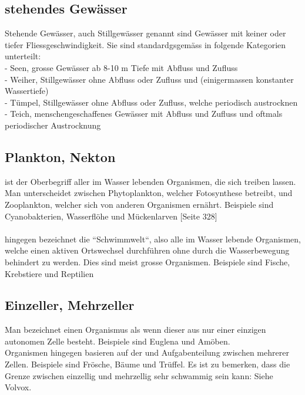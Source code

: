 \documentclass{article}
\begin{document}
    \subsection{stehendes Gewässer}
    
        Stehende Gewässer, auch Stillgewässer genannt sind Gewässer mit keiner oder tiefer Fliessgeschwindigkeit. Sie sind standardgsgemäss in folgende Kategorien unterteilt: \\
        
        - Seen, grosse Gewässer ab 8-10 m Tiefe mit Abfluss und Zufluss \\
        - Weiher, Stillgewässer ohne Abfluss oder Zufluss und (einigermassen konstanter Wassertiefe) \\
        - Tümpel, Stillgewässer ohne Abfluss oder Zufluss, welche periodisch austrocknen \\
        - Teich, menschengeschaffenes Gewässer mit Abfluss und Zufluss und oftmals periodischer Austrocknung \\ \cite{Kleingewasserkunde}
    
    \subsection{Plankton, Nekton}
    
         ist der Oberbegriff aller im Wasser lebenden Organismen, die sich treiben lassen. Man unterscheidet zwischen Phytoplankton, welcher Fotosynthese betreibt, und Zooplankton, welcher sich von anderen Organismen ernährt. Beispiele sind Cyanobakterien, Wasserflöhe und Mückenlarven \cite{Biobuch} [Seite 328] \\ \\
        \vspace{5mm}
         hingegen bezeichnet die ``Schwimmwelt``, also alle im Wasser lebende Organismen, welche einen aktiven Ortswechsel durchführen ohne durch die Wasserbewegung behindert zu werden. Dies sind meist grosse Organismen. Beispiele sind Fische, Krebstiere und Reptilien \cite{Spektrum} \cite{Was}
    
    \subsection{Einzeller, Mehrzeller}
    
        Man bezeichnet einen Organismus als  wenn dieser aus nur einer einzigen autonomen Zelle besteht. Beispiele sind Euglena und Amöben. \\  Organismen hingegen basieren auf der und Aufgabenteilung zwischen mehrerer Zellen. Beispiele sind Frösche, Bäume und Trüffel.
        Es ist zu bemerken, dass die Grenze zwischen einzellig und mehrzellig sehr schwammig sein kann: Siehe Volvox.
    
\end{document}
